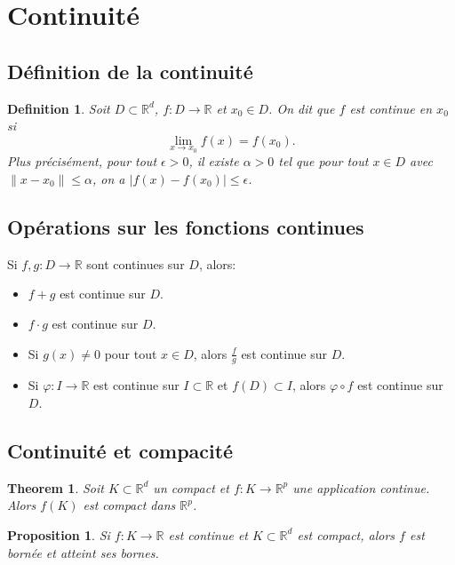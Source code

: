 \documentclass{article}
\newtheorem{theorem}{Theorem}
\newtheorem{proposition}{Proposition}
\newtheorem{definition}{Definition}
\begin{document}
\sloppy

\section{Continuité}

\subsection{Définition de la continuité}

\begin{definition}
Soit $D \subset \mathbb{R}^d$, $f: D \rightarrow \mathbb{R}$ et $x_0 \in D$.
On dit que $f$ est continue en $x_0$ si
\[
\lim_{x \rightarrow x_0} f(x) = f(x_0).
\]
Plus précisément, pour tout $\epsilon > 0$, il existe $\alpha > 0$ tel que pour tout $x \in D$ avec $\|x - x_0\| \leq \alpha$, on a $|f(x) - f(x_0)| \leq \epsilon$.
\end{definition}

\subsection{Opérations sur les fonctions continues}
Si $f, g: D \rightarrow \mathbb{R}$ sont continues sur $D$, alors:
\begin{itemize}
    \item $f + g$ est continue sur $D$.
    \item $f \cdot g$ est continue sur $D$.
    \item Si $g(x) \neq 0$ pour tout $x \in D$, alors $\frac{f}{g}$ est continue sur $D$.
    \item Si $\varphi: I \rightarrow \mathbb{R}$ est continue sur $I \subset \mathbb{R}$ et $f(D) \subset I$, alors $\varphi \circ f$ est continue sur $D$.
\end{itemize}

\subsection{Continuité et compacité}

\begin{theorem}
Soit $K \subset \mathbb{R}^d$ un compact et $f: K \rightarrow \mathbb{R}^p$ une application continue.
Alors $f(K)$ est compact dans $\mathbb{R}^p$.
\end{theorem}

\begin{proposition}
Si $f: K \rightarrow \mathbb{R}$ est continue et $K \subset \mathbb{R}^d$ est compact, alors $f$ est bornée et atteint ses bornes.
\end{proposition}
\end{document}
